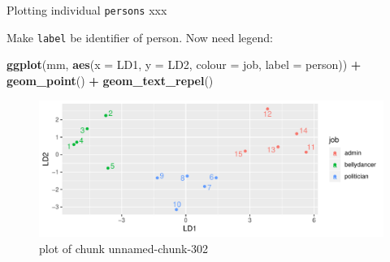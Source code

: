 \documentclass[ignorenonframetext,]{beamer}
\newenvironment{Shaded}{\begin{snugshade}}{\end{snugshade}}
\newcommand{\DataTypeTok}[1]{\textcolor[rgb]{0.13,0.29,0.53}{#1}}
\newcommand{\KeywordTok}[1]{\textcolor[rgb]{0.13,0.29,0.53}{\textbf{#1}}}
\newcommand{\NormalTok}[1]{#1}
\newcommand{\OperatorTok}[1]{\textcolor[rgb]{0.81,0.36,0.00}{\textbf{#1}}}
\newcommand{\StringTok}[1]{\textcolor[rgb]{0.31,0.60,0.02}{#1}}
\begin{document}
\begin{frame}[fragile]{Plotting individual \texttt{persons} xxx}
\protect\hypertarget{plotting-individual-persons-xxx}{}

Make \texttt{label} be identifier of person. Now need legend:

\begin{Shaded}
\begin{Highlighting}[]
\KeywordTok{ggplot}\NormalTok{(mm, }\KeywordTok{aes}\NormalTok{(}\DataTypeTok{x =}\NormalTok{ LD1, }\DataTypeTok{y =}\NormalTok{ LD2,  }\DataTypeTok{colour =}\NormalTok{ job, }
               \DataTypeTok{label =}\NormalTok{ person)) }\OperatorTok{+}\StringTok{ }
\StringTok{  }\KeywordTok{geom_point}\NormalTok{() }\OperatorTok{+}\StringTok{ }\KeywordTok{geom_text_repel}\NormalTok{()}
\end{Highlighting}
\end{Shaded}

\begin{figure}
\centering
\includegraphics{figure/unnamed-chunk-302-1.pdf}
\caption{plot of chunk unnamed-chunk-302}
\end{figure}

\end{frame}
\end{document}
